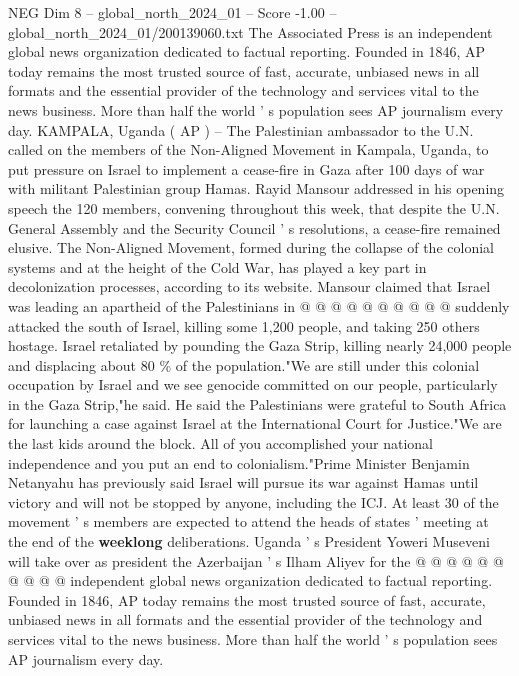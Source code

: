 \begin{textsample}{NEG Dim 8 – global\_north\_2024\_01 – Score -1.00 – global\_north\_2024\_01/200139060.txt}  \label{ex:f8_neg_217}
The Associated Press is an independent global news organization dedicated to factual reporting.
Founded in 1846, AP today remains the most trusted source of fast, accurate, unbiased news in all formats and the essential provider of the technology and services vital to the news business.
More than half the world ' s population sees AP journalism every day.
KAMPALA, Uganda ( AP ) -- The Palestinian ambassador to the U.N. called on the members of the Non-Aligned Movement in Kampala, Uganda, to put pressure on Israel to implement a cease-fire in Gaza after 100 days of war with militant Palestinian group Hamas.
Rayid Mansour addressed in his opening speech the 120 members, convening throughout this week, that despite the U.N.
General Assembly and the Security Council ' s resolutions, a cease-fire remained elusive.
The Non-Aligned Movement, formed during the collapse of the colonial systems and at the height of the Cold War, has played a key part in decolonization processes, according to its website.
Mansour claimed that Israel was leading an apartheid of the Palestinians in @ @ @ @ @ @ @ @ @ @ suddenly attacked the south of Israel, killing some 1,200 people, and taking 250 others hostage.
Israel retaliated by pounding the Gaza Strip, killing nearly 24,000 people and displacing about 80 \% of the population."We are still under this colonial occupation by Israel and we see genocide committed on our people, particularly in the Gaza Strip,"he said.
He said the Palestinians were grateful to South Africa for launching a case against Israel at the International Court for Justice."We are the last kids around the block.
All of you accomplished your national independence and you put an end to colonialism."Prime Minister Benjamin Netanyahu has previously said Israel will pursue its war against Hamas until victory and will not be stopped by anyone, including the ICJ.
At least 30 of the movement ' s members are expected to attend the heads of states ' meeting at the end of the \textbf{weeklong} deliberations.
Uganda ' s President Yoweri Museveni will take over as president the Azerbaijan ' s Ilham Aliyev for the @ @ @ @ @ @ @ @ @ @ independent global news organization dedicated to factual reporting.
Founded in 1846, AP today remains the most trusted source of fast, accurate, unbiased news in all formats and the essential provider of the technology and services vital to the news business.
More than half the world ' s population sees AP journalism every day.

\end{textsample}
